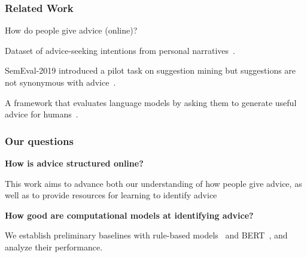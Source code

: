 \begin{frame}[c]\frametitle{Related Work}

\begin{center}
\alert{\large How do people give advice (online)?}
\end{center}

\pause

\vfill

\begin{description}\itemsep10pt
    \item[Advice Questions] Dataset of advice-seeking intentions from personal narratives~\citep{fu-etal-2019-asking}.

    \item[Suggestion Mining] SemEval-2019 introduced a pilot task on suggestion mining but suggestions are not synonymous with advice~\citep{negi-etal-2019-semeval}.

    \item[TuringAdvice] A framework that evaluates language models by asking them to generate useful advice for humans~\citep{zellers2020evaluating}.
\end{description}


\end{frame}


\begin{frame}[c]\frametitle{Our questions}

\pause

\textbf{How is advice structured online?}

This work aims to advance both our understanding of how people give advice, as well as to provide resources for learning to identify advice

\pause

\vspace{5mm}

\textbf{How good are computational models at identifying advice?}

We establish preliminary baselines with rule-based models~\citep{negi-etal-2019-semeval,potamias-etal-2019-ntua} and BERT~\citep{devlin_bert:_2019}, and analyze their performance.

\end{frame}